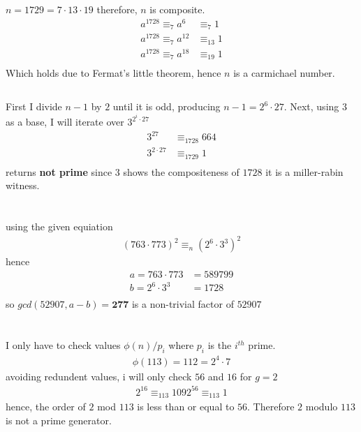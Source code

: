 \documentclass{article}
\begin{document}
\newpage
\section{}
\subsection{}
$n = 1729 = 7 \cdot 13 \cdot 19$ therefore, $n$ is composite. 
\[
\begin{split}
a^{1728} \equiv_{7} a^{6} &\equiv_{7} 1   \\
a^{1728} \equiv_{7} a^{12} &\equiv_{13} 1 \\
a^{1728} \equiv_{7} a^{18} &\equiv_{19} 1 \\
\end{split}
\]
Which holds due to Fermat's little theorem, hence $n$ is a carmichael number.
\subsection{}
First I divide $n-1$ by $2$ until it is odd, producing $n-1 = 2^{6} \cdot 27$.
Next, using $3$ as a base, I will iterate over $3^{2^{i}\cdot 27}$
\[
\begin{split}
3^{27} &\equiv_{1728} 664 \\
3^{2 \cdot 27} &\equiv_{1729} 1 \\
\end{split}
\]
returns \textbf{not prime}
\newline
since $3$ shows the compositeness of $1728$ it is a miller-rabin witness.
\newpage
\section{}
using the given equiation
\[
\begin{split}
(763\cdot 773)^{2} \equiv_{n} (2^{6}\cdot 3^{3})^{2}
\end{split}
\]
hence
\[
\begin{split}
a = 763\cdot 773 &= 589799 \\
b = 2^{6}\cdot 3^{3} &= 1728 \\
\end{split}
\]
so $gcd(52907, a - b) = \textbf{277}$ is a non-trivial factor of $52907$
\newpage
\section{}
I only have to check values $\phi(n)/p_{i}$ where $p_{i}$ is the $i^{th}$ prime.
\[
\begin{split}
\phi(113) = 112 = 2^{4} \cdot 7
\end{split}
\]
avoiding redundent values, i will only check $56$ and $16$ for $g = 2$
\[
\begin{split}
2^{16} \equiv_{113} 109
2^{56} \equiv_{113} 1
\end{split}
\]
hence, the order of $2$ mod $113$ is less than or equal to $56$. Therefore $2$ modulo $113$ is not a prime generator.
\end{document}
